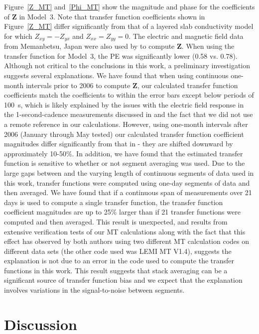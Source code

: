 \documentclass[draft,linenumbers]{agujournal2018}
\begin{document}
Figure~\ref{Z_MT} and~\ref{Phi_MT} show the magnitude and phase for the coefficients of $\mathbf{Z}$ in Model~3. Note that transfer function coefficients shown in Figure~\ref{Z_MT} differ significantly from that of a layered slab conductivity model for which $Z_{xy}=-Z_{yx}$ and $Z_{xx}=Z_{yy}=0$. The electric and magnetic field data from Memanbetsu, Japan were also used by \cite{Fujii2015} to compute $\mathbf{Z}$. When using the \cite{Fujii2015} transfer function for Model~3, the PE was significantly lower (0.58 vs. 0.78). Although not critical to the conclusions in this work, a preliminary investigation suggests several explanations. We have found that when using continuous one-month intervals prior to 2006 to compute $\mathbf{Z}$, our calculated transfer function coefficients match the \cite{Fujii2015} coefficients to within the error bars except below periods of 100~s, which is likely explained by the issues with the electric field response in the 1-second-cadence measurements discussed in \cite{Fujii2015} and the fact that we did not use a remote reference in our calculations. However, using one-month intervals after 2006 (January through May tested) our calculated transfer function coefficient magnitudes differ significantly from that in \cite{Fujii2015} - they are shifted downward by approximately 10-50\%. In addition, we have found that the estimated transfer function is sensitive to whether or not segment averaging was used. Due to the large gaps between and the varying length of continuous segments of data used in this work, transfer functions were computed using one-day segments of data and then averaged. We have found that if a continuous span of measurements over 21 days is used to compute a single transfer function, the transfer function coefficient magnitudes are up to 25\% larger than if 21 transfer functions were computed and then averaged. This result is unexpected, and results from extensive verification tests of our MT calculations along with the fact that this effect has observed by both authors using two different MT calculation codes on different data sets (the other code used was LEMI MT V1.4), suggests the explanation is not due to an error in the code used to compute the transfer functions in this work. This result suggests that stack averaging can be a significant source of transfer function bias and we expect that the explanation involves variations in the signal-to-noise between segments.

\section{Discussion}
\label{discussion}
\end{document}
